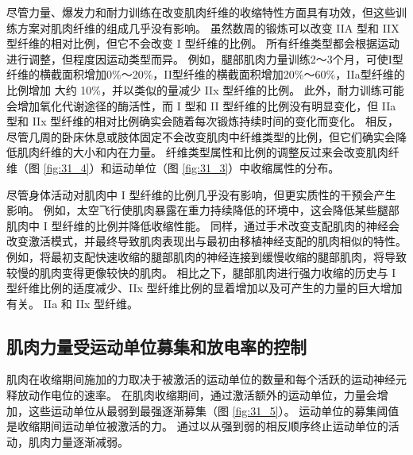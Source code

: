 尽管力量、爆发力和耐力训练在改变肌肉纤维的收缩特性方面具有功效，但这些训练方案对肌肉纤维的组成几乎没有影响。
虽然数周的锻炼可以改变 IIA 型和 IIX 型纤维的相对比例，但它不会改变 I 型纤维的比例。
所有纤维类型都会根据运动进行调整，但程度因运动类型而异。
例如，腿部肌肉力量训练2～3个月，可使I型纤维的横截面积增加0\%～20\%，II型纤维的横截面积增加20\%～60\%，IIa型纤维的比例增加 大约 10\%，并以类似的量减少 IIx 型纤维的比例。
此外，耐力训练可能会增加氧化代谢途径的酶活性，而 I 型和 II 型纤维的比例没有明显变化，但 IIa 型和 IIx 型纤维的相对比例确实会随着每次锻炼持续时间的变化而变化。
相反，尽管几周的卧床休息或肢体固定不会改变肌肉中纤维类型的比例，但它们确实会降低肌肉纤维的大小和内在力量。
纤维类型属性和比例的调整反过来会改变肌肉纤维（图 \ref{fig:31_4}）和运动单位（图 \ref{fig:31_3}）中收缩属性的分布。


尽管身体活动对肌肉中 I 型纤维的比例几乎没有影响，但更实质性的干预会产生影响。
例如，太空飞行使肌肉暴露在重力持续降低的环境中，这会降低某些腿部肌肉中 I 型纤维的比例并降低收缩性能。
同样，通过手术改变支配肌肉的神经会改变激活模式，并最终导致肌肉表现出与最初由移植神经支配的肌肉相似的特性。
例如，将最初支配快速收缩的腿部肌肉的神经连接到缓慢收缩的腿部肌肉，将导致较慢的肌肉变得更像较快的肌肉。
相比之下，腿部肌肉进行强力收缩的历史与 I 型纤维比例的适度减少、IIx 型纤维比例的显着增加以及可产生的力量的巨大增加有关。 IIa 和 IIx 型纤维。



\subsection{肌肉力量受运动单位募集和放电率的控制}

肌肉在收缩期间施加的力取决于被激活的运动单位的数量和每个活跃的运动神经元释放动作电位的速率。
在肌肉收缩期间，通过激活额外的运动单位，力量会增加，这些运动单位从最弱到最强逐渐募集（图 \ref{fig:31_5}）。
运动单位的募集阈值是收缩期间运动单位被激活的力。
通过以从强到弱的相反顺序终止运动单位的活动，肌肉力量逐渐减弱。


